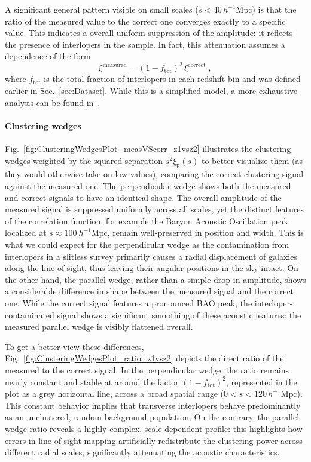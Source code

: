 \documentclass[12pt,a4paper,oneside]{report}
\begin{document}
A significant general pattern visible on small scales ($s < 40 \, h^{-1}\mathrm{Mpc}$) is that the ratio of the measured value to the correct one converges exactly to a specific value. This indicates a overall uniform suppression of the amplitude: it reflects the presence of interlopers in the sample. In fact, this attenuation assumes a dependence of the form
\begin{equation}
  \xi^\mathrm{measured} = (1 - f_\mathrm{tot})^2 \, \xi^\mathrm{correct} \; ,
  \label{eq:InterloperSuppression}
\end{equation}
where $f_\mathrm{tot}$ is the total fraction of interlopers in each redshift bin and was defined earlier in Sec.~\ref{sec:Dataset}. While this is a simplified model, a more exhaustive analysis can be found in~\cite{IlariaR}.

\paragraph{Clustering wedges}
Fig.~\ref{fig:ClusteringWedgesPlot_measVScorr_z1vsz2} illustrates the clustering wedges weighted by the squared separation $s^2\xi_\mathrm{p}(s)$ to better visualize them (as they would otherwise take on low values), comparing the correct clustering signal against the measured one.
The perpendicular wedge shows both the measured and correct signals to have an identical  shape. The overall amplitude of the measured signal is suppressed uniformly across all scales, yet the distinct features of the correlation function, for example the Baryon Acoustic Oscillation peak localized at $s \approx 100 \ h^{-1} \mathrm{Mpc}$, remain well-preserved in position and width. This is what we could expect for the perpendicular wedge as the contamination from interlopers in a slitless survey primarily causes a radial displacement of galaxies along the line-of-sight, thus leaving their angular positions in the sky intact. On the other hand, the parallel wedge, rather than a simple drop in amplitude, shows a considerable difference in shape between the measured signal and the correct one. While the correct signal features a pronounced BAO peak, the interloper-contaminated signal shows a significant smoothing of these acoustic features: the measured parallel wedge is visibly flattened overall.

To get a better view these differences, Fig.~\ref{fig:ClusteringWedgesPlot_ratio_z1vsz2} depicts the direct ratio of the measured to the correct signal.
In the perpendicular wedge, the ratio remains nearly constant and stable at around the factor $(1 - f_\mathrm{tot})^2$, represented in the plot as a grey horizontal line, across a broad spatial range ($0 < s < 120 \, h^{-1}\mathrm{Mpc}$). This constant behavior implies that transverse interlopers behave predominantly as an unclustered, random background population.  On the contrary, the parallel wedge ratio reveals a highly complex, scale-dependent profile: this highlights how errors in line-of-sight mapping artificially redistribute the clustering power across different radial scales, significantly attenuating the acoustic characteristics.
\end{document}
